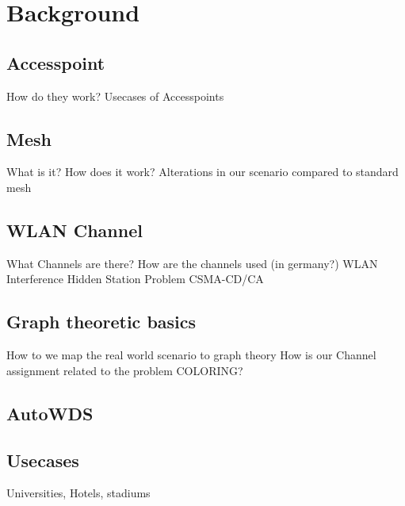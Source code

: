 \chapter{Background}
\section{Accesspoint}
	How do they work?\newline
	Usecases of Accesspoints\newline
\section{Mesh}
	What is it?\newline
	How does it work?\newline
	Alterations in our scenario compared to standard mesh\newline
\section{WLAN Channel}
	What Channels are there? \newline
	How are the channels used (in germany?)\newline
	WLAN Interference\newline
	Hidden Station Problem\newline
	CSMA-CD/CA\newline
\section{Graph theoretic basics}
	How to we map the real world scenario to graph theory\newline
	How is our Channel assignment related to the problem COLORING?\newline
\section{AutoWDS}
\section{Usecases}
	Universities, Hotels, stadiums\newline
